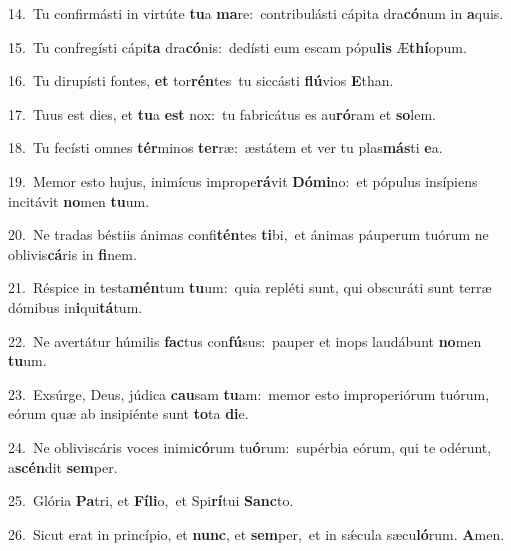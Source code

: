 {\numbfont\textcolor{\numbcolor}{14.}}~Tu confirmásti in virtúte \textbf{tu}\-a \textbf{ma}\-re:~\star contribulásti cápita dra\-\textbf{có}\-num in \textbf{a}\-quis.\par
{\numbfont\textcolor{\numbcolor}{15.}}~Tu confregísti cápi\textbf{ta} dra\-\textbf{có}\-nis:~\star dedísti eum escam pópu\textbf{lis} Æ\-\textbf{thí}\-opum.\par
{\numbfont\textcolor{\numbcolor}{16.}}~Tu dirupísti fontes, \textbf{et} tor\-\textbf{rén}\-tes~\star tu siccásti \textbf{flú}\-vios \textbf{E}\-than.\par
{\numbfont\textcolor{\numbcolor}{17.}}~Tuus est dies, et \textbf{tu}\-a \textbf{est} nox:~\star tu fabricátus es au\-\textbf{ró}\-ram et \textbf{so}\-lem.\par
{\numbfont\textcolor{\numbcolor}{18.}}~Tu fecísti omnes \textbf{tér}\-minos \textbf{ter}\-ræ:~\star æstátem et ver tu plas\-\textbf{más}\-ti \textbf{e}\-a.\par
{\numbfont\textcolor{\numbcolor}{19.}}~Memor esto hujus, inimícus imprope\-\textbf{rá}\-vit \textbf{Dó}\-\textbf{mi}no:~\star et pópulus insípiens incitávit \textbf{no}\-men \textbf{tu}\-um.\par
{\numbfont\textcolor{\numbcolor}{20.}}~Ne tradas béstiis ánimas confi\-\textbf{tén}\-tes \textbf{ti}\-bi,~\star et ánimas páuperum tuórum ne oblivis\-\textbf{cá}\-ris in \textbf{fi}\-nem.\par
{\numbfont\textcolor{\numbcolor}{21.}}~Réspice in testa\-\textbf{mén}\-tum \textbf{tu}\-um:~\star quia repléti sunt, qui obscuráti sunt terræ dómibus in\-\textbf{i}\-qui\-\textbf{tá}\-tum.\par
{\numbfont\textcolor{\numbcolor}{22.}}~Ne avertátur húmilis \textbf{fac}\-tus con\-\textbf{fú}\-sus:~\star pauper et inops laudábunt \textbf{no}\-men \textbf{tu}\-um.\par
{\numbfont\textcolor{\numbcolor}{23.}}~Exsúrge, Deus, júdica \textbf{cau}\-sam \textbf{tu}\-am:~\star memor esto improperiórum tuórum, eórum quæ ab insipiénte sunt \textbf{to}\-ta \textbf{di}\-e.\par
{\numbfont\textcolor{\numbcolor}{24.}}~Ne obliviscáris voces inimi\-\textbf{có}\-rum tu\-\textbf{ó}\-rum:~\star supérbia eórum, qui te odérunt, a\-\textbf{scén}\-dit \textbf{sem}\-per.\par
{\numbfont\textcolor{\numbcolor}{25.}}~Glória \textbf{Pa}\-tri, et \textbf{Fí}\-\textbf{li}o,~\star et Spi\-\textbf{rí}\-tui \textbf{Sanc}\-to.\par
{\numbfont\textcolor{\numbcolor}{26.}}~Sicut erat in princípio, et \textbf{nunc}\-, et \textbf{sem}\-per,~\star et in sǽcula sæcu\-\textbf{ló}\-rum. \textbf{A}\-men.\par

